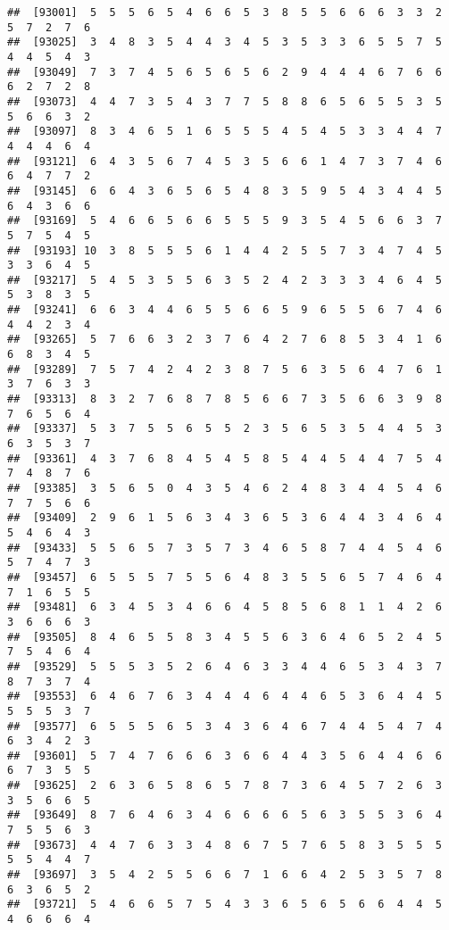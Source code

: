 \documentclass[
]{book}
\begin{document}
\begin{verbatim}
##  [93001]  5  5  5  6  5  4  6  6  5  3  8  5  5  6  6  6  3  3  2  5  7  2  7  6
##  [93025]  3  4  8  3  5  4  4  3  4  5  3  5  3  3  6  5  5  7  5  4  4  5  4  3
##  [93049]  7  3  7  4  5  6  5  6  5  6  2  9  4  4  4  6  7  6  6  6  2  7  2  8
##  [93073]  4  4  7  3  5  4  3  7  7  5  8  8  6  5  6  5  5  3  5  5  6  6  3  2
##  [93097]  8  3  4  6  5  1  6  5  5  5  4  5  4  5  3  3  4  4  7  4  4  4  6  4
##  [93121]  6  4  3  5  6  7  4  5  3  5  6  6  1  4  7  3  7  4  6  6  4  7  7  2
##  [93145]  6  6  4  3  6  5  6  5  4  8  3  5  9  5  4  3  4  4  5  6  4  3  6  6
##  [93169]  5  4  6  6  5  6  6  5  5  5  9  3  5  4  5  6  6  3  7  5  7  5  4  5
##  [93193] 10  3  8  5  5  5  6  1  4  4  2  5  5  7  3  4  7  4  5  3  3  6  4  5
##  [93217]  5  4  5  3  5  5  6  3  5  2  4  2  3  3  3  4  6  4  5  5  3  8  3  5
##  [93241]  6  6  3  4  4  6  5  5  6  6  5  9  6  5  5  6  7  4  6  4  4  2  3  4
##  [93265]  5  7  6  6  3  2  3  7  6  4  2  7  6  8  5  3  4  1  6  6  8  3  4  5
##  [93289]  7  5  7  4  2  4  2  3  8  7  5  6  3  5  6  4  7  6  1  3  7  6  3  3
##  [93313]  8  3  2  7  6  8  7  8  5  6  6  7  3  5  6  6  3  9  8  7  6  5  6  4
##  [93337]  5  3  7  5  5  6  5  5  2  3  5  6  5  3  5  4  4  5  3  6  3  5  3  7
##  [93361]  4  3  7  6  8  4  5  4  5  8  5  4  4  5  4  4  7  5  4  7  4  8  7  6
##  [93385]  3  5  6  5  0  4  3  5  4  6  2  4  8  3  4  4  5  4  6  7  7  5  6  6
##  [93409]  2  9  6  1  5  6  3  4  3  6  5  3  6  4  4  3  4  6  4  5  4  6  4  3
##  [93433]  5  5  6  5  7  3  5  7  3  4  6  5  8  7  4  4  5  4  6  5  7  4  7  3
##  [93457]  6  5  5  5  7  5  5  6  4  8  3  5  5  6  5  7  4  6  4  7  1  6  5  5
##  [93481]  6  3  4  5  3  4  6  6  4  5  8  5  6  8  1  1  4  2  6  3  6  6  6  3
##  [93505]  8  4  6  5  5  8  3  4  5  5  6  3  6  4  6  5  2  4  5  7  5  4  6  4
##  [93529]  5  5  5  3  5  2  6  4  6  3  3  4  4  6  5  3  4  3  7  8  7  3  7  4
##  [93553]  6  4  6  7  6  3  4  4  4  6  4  4  6  5  3  6  4  4  5  5  5  5  3  7
##  [93577]  6  5  5  5  6  5  3  4  3  6  4  6  7  4  4  5  4  7  4  6  3  4  2  3
##  [93601]  5  7  4  7  6  6  6  3  6  6  4  4  3  5  6  4  4  6  6  6  7  3  5  5
##  [93625]  2  6  3  6  5  8  6  5  7  8  7  3  6  4  5  7  2  6  3  3  5  6  6  5
##  [93649]  8  7  6  4  6  3  4  6  6  6  6  5  6  3  5  5  3  6  4  7  5  5  6  3
##  [93673]  4  4  7  6  3  3  4  8  6  7  5  7  6  5  8  3  5  5  5  5  5  4  4  7
##  [93697]  3  5  4  2  5  5  6  6  7  1  6  6  4  2  5  3  5  7  8  6  3  6  5  2
##  [93721]  5  4  6  6  5  7  5  4  3  3  6  5  6  5  6  6  4  4  5  4  6  6  6  4

\end{verbatim}
\end{document}
